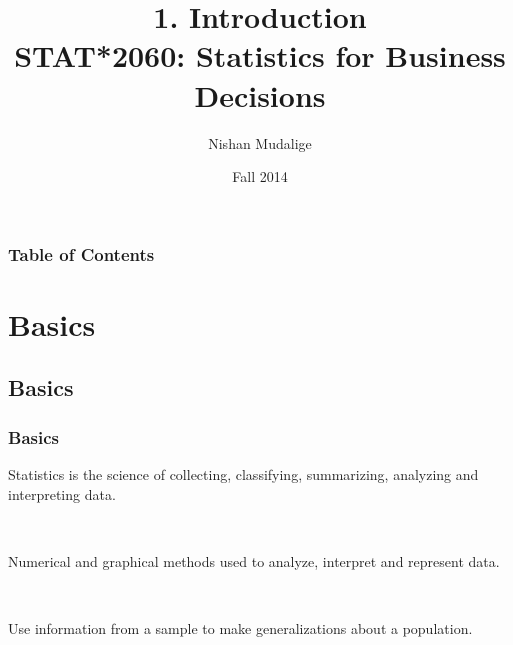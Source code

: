\documentclass[xcolor=svgnames, compress]{beamer}
\title{1. Introduction\\
\vspace*{-0.25cm}
{\normalsize{STAT*2060: Statistics for Business Decisions} } }
\author{Nishan Mudalige}
\institute{Department of Mathematics and Statistics\\
University of Guelph}
\date[STAT*2060F14]{Fall 2014}
\begin{document}
\small


\begin{frame}
\vspace{-2.0cm}
\maketitle
\end{frame}


\begin{frame}
\frametitle{Table of Contents}
\tableofcontents
\end{frame}


\section{Basics}



\subsection*{Basics}

\begin{frame}
\frametitle{Basics} 


\vspace{-0.50cm}
\begin{definition}[Statistics]
\justifying
Statistics is the science of collecting, classifying, summarizing, analyzing and interpreting data.
\end{definition}


\hfill\\

\begin{definition}
\justifying
Numerical and graphical methods used to analyze, interpret and represent data.
\end{definition}


\hfill\\

\begin{definition}
\justifying
Use information from a sample to make generalizations about a population.
\end{definition}



\end{frame}
\end{document}
